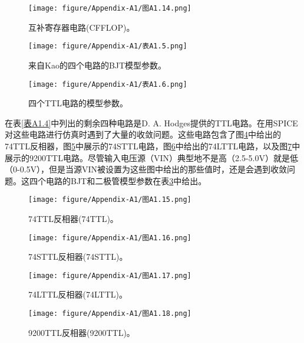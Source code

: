 \begin{figure}[htbp]
\small
    \centering
    \texttt{[image: figure/Appendix-A1/图A1.14.png]}
    \caption{互补寄存器电路(CFFLOP)。}
    \label{图A1.14}
\end{figure}

\begin{figure}[htbp]
\small
    \centering
    \texttt{[image: figure/Appendix-A1/表A1.5.png]}
    \caption{来自Kao的四个电路的BJT模型参数。}
    \label{表A1.5}
\end{figure}

\begin{figure}[htbp]
\small
    \centering
    \texttt{[image: figure/Appendix-A1/表A1.6.png]}
    \caption{四个TTL电路的模型参数。}
    \label{表A1.6}
\end{figure}

在表\ref{表A1.4}中列出的剩余四种电路是D. A. Hodges\cite{ref-76}提供的TTL电路。在用SPICE对这些电路进行仿真时遇到了大量的收敛问题。这些电路包含了图\ref{图A1.15}中给出的74TTL反相器，图\ref{图A1.16}中展示的74STTL电路，图\ref{图A1.17}中给出的74LTTL电路，以及图\ref{图A1.18}中展示的9200TTL电路。尽管输入电压源（VIN）典型地不是高（2.5-5.0V）就是低（0-0.5V），但是当源VIN被设置为这些图中给出的那些值时，还是会遇到收敛问题。这四个电路的BJT和二极管模型参数在表\ref{表A1.6}中给出。

\begin{figure}[htbp]
\small
    \centering
    \texttt{[image: figure/Appendix-A1/图A1.15.png]}
    \caption{74TTL反相器(74TTL)。}
    \label{图A1.15}
\end{figure}

\begin{figure}[htbp]
\small
    \centering
    \texttt{[image: figure/Appendix-A1/图A1.16.png]}
    \caption{74STTL反相器(74STTL)。}
    \label{图A1.16}
\end{figure}

\begin{figure}[htbp]
\small
    \centering
    \texttt{[image: figure/Appendix-A1/图A1.17.png]}
    \caption{74LTTL反相器(74LTTL)。}
    \label{图A1.17}
\end{figure}

\begin{figure}[htbp]
\small
    \centering
    \texttt{[image: figure/Appendix-A1/图A1.18.png]}
    \caption{9200TTL反相器(9200TTL)。}
    \label{图A1.18}
\end{figure}

